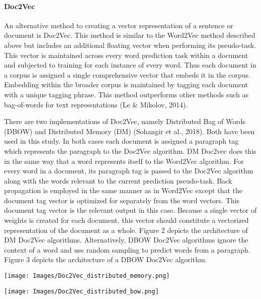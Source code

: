 \documentclass[11pt,preprint, authoryear]{elsarticle}
\let\origfigure\figure
\let\endorigfigure\endfigure
\renewenvironment{figure}[1][2] {
    \expandafter\origfigure\expandafter[H]
} {
    \endorigfigure
}
\numberwithin{equation}{section}
\numberwithin{figure}{section}
\numberwithin{table}{section}
\begin{document}
\hypertarget{doc2vec}{%
\paragraph{Doc2Vec}\label{doc2vec}}

An alternative method to creating a vector representation of a sentence
or document is Doc2Vec. This method is similar to the Word2Vec method
described above but includes an additional floating vector when
performing its pseudo-task. This vector is maintained across every word
prediction task within a document and subjected to training for each
instance of every word. Thus each document in a corpus is assigned a
single comprehensive vector that embeds it in the corpus. Embedding
within the broader corpus is maintained by tagging each document with a
unique tagging phrase. This method outperforms other methods such as
bag-of-words for text representations (Le \& Mikolov, 2014).

There are two implementations of Doc2Vec, namely Distributed Bag of
Words (DBOW) and Distributed Memory (DM) (Sohangir et al., 2018). Both
have been used in this study. In both cases each document is assigned a
paragraph tag which represents the paragraph to the Doc2Vec algorithm.
DM Doc2vec does this in the same way that a word represents itself to
the Word2Vec algorithm. For every word in a document, its paragraph tag
is passed to the Doc2Vec algorithm along with the words relevant to the
current prediction pseudo-task. Back propagation is employed in the same
manner as in Word2Vec except that the document tag vector is optimized
for separately from the word vectors. This document tag vector is the
relevant output in this case. Because a single vector of weights is
created for each document, this vector should constitute a vectorized
representation of the document as a whole. Figure 2 depicts the
architecture of DM Doc2Vec algorithms. Alternatively, DBOW Doc2Vec
algorithms ignore the context of a word and use random sampling to
predict words from a paragraph. Figure 3 depicts the architecture of a
DBOW Doc2Vec algorithm.

\begin{figure}
\centering
\texttt{[image: Images/Doc2Vec\_distributed\_memory.png]}
\caption{Doc2Vec model - distributed memory architecture: dm = 1}
\end{figure}

\begin{figure}
\centering
\texttt{[image: Images/Doc2Vec\_distributed\_bow.png]}
\caption{Doc2Vec model - distributed bag of words architecture: dm = 0}
\end{figure}
\end{document}
